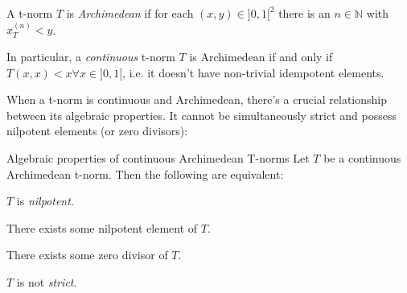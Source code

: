 \begin{definition}
A t-norm $T$ is \emph{Archimedean} if for each $(x,y) \in ]0,1[^2$ there is an $n \in \mathbb{N}$ with $x_T^{(n)} < y$. \cite[Def.~2.9]{Klement2000}  

In particular, a \textit{continuous} t-norm $T$ is Archimedean if and only if $T(x,x) < x \forall x \in ]0,1[$, i.e. it doesn't have non-trivial idempotent elements. \cite[Thm.~2.12]{Klement2000}
\end{definition}


When a t-norm is continuous and Archimedean, there's a crucial relationship between its algebraic properties. It cannot be simultaneously strict and possess nilpotent elements (or zero divisors):

\begin{theorem}{Algebraic properties of continuous Archimedean T-norms \cite[Thm.~2.18]{Klement2000}}\label{thm:alg_arch_cont}
Let $T$ be a continuous Archimedean t-norm. Then the following are equivalent:
\begin{romanenum}
    \item $T$ is \emph{nilpotent}.
    \item There exists some nilpotent element of $T$.
    \item There exists some zero divisor of $T$.
    \item $T$ is not \emph{strict}.
\end{romanenum}
\end{theorem}



